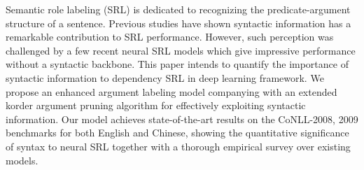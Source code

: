 Semantic role labeling (SRL) is dedicated to recognizing the predicate-argument structure of a sentence. Previous studies have shown syntactic information has a remarkable contribution to SRL performance. However, such perception was challenged by a few recent neural SRL models which give impressive performance without a syntactic backbone. This paper intends to quantify the importance of syntactic information to dependency SRL in deep learning framework. We propose an enhanced argument labeling model companying with an extended korder argument pruning algorithm for effectively exploiting syntactic information. Our model achieves state-of-the-art results on the CoNLL-2008, 2009 benchmarks for both English and Chinese, showing the quantitative significance of syntax to neural SRL together with a thorough empirical survey over existing models.
